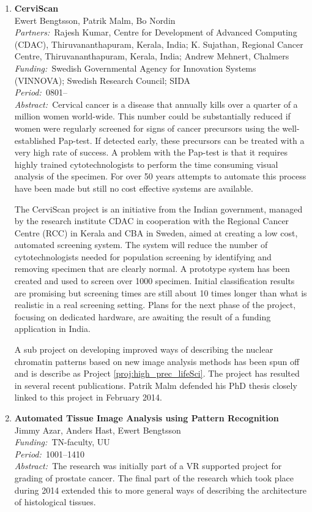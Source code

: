 \documentclass[10pt, a4paper]{article}
\newcommand{\aabstract}[1]{\emph{Abstract:~}#1}
\newcommand{\ffunding}[1]{\emph{Funding:~}#1\\}
\newcommand{\ppartners}[1]{\emph{Partners:~}#1\\}
\newcommand{\pperiod}[1]{\emph{Period:~}#1\\}
\begin{document}
{\begin{enumerate}

\item \textbf{CerviScan}\\
Ewert Bengtsson, Patrik Malm, Bo Nordin\\
\ppartners{Rajesh Kumar, Centre for Development of Advanced Computing (CDAC), Thiruvananthapuram, Kerala, India; K. Sujathan, Regional Cancer Centre, Thiruvananthapuram, Kerala, India; Andrew Mehnert, Chalmers}
\ffunding{Swedish Governmental Agency for Innovation Systems (VINNOVA); Swedish Research Council; SIDA}
\pperiod{0801--}
\aabstract{Cervical cancer is a disease that annually kills over a quarter of a million women world-wide. This number could be substantially reduced if women were regularly screened for signs of cancer precursors using the well-established Pap-test. If detected early, these precursors can be treated with a very high rate of success. A problem with the Pap-test is that it requires highly trained cytotechnologists to perform the time consuming visual analysis of the specimen. For over 50 years attempts to automate this process have been made but still no cost effective systems are available.
	
The CerviScan project is an initiative from the Indian government, managed by the research institute CDAC in cooperation with the Regional Cancer Centre (RCC) in Kerala and CBA in Sweden, aimed at creating a low cost, automated screening system. The system will reduce the number of cytotechnologists needed for population screening by identifying and removing specimen that are clearly normal. A prototype system has been created and used to screen over 1000 specimen. Initial classification results are promising but screening times are still about 10 times longer than what is realistic in a real screening setting. Plans for the next phase of the project, focusing on dedicated hardware, are awaiting the result of a funding application in India.
 
A sub project on developing improved ways of describing the nuclear chromatin patterns based on new image analysis methods has been spun off and is describe as Project \ref{proj:high_prec_lifeSci}. The project has resulted in several recent publications. Patrik Malm defended his PhD thesis closely linked to this project in February 2014.}


\item 
\textbf{Automated Tissue Image Analysis using Pattern Recognition}\\
Jimmy Azar, Anders Hast, Ewert Bengtsson \\
\ffunding{TN-faculty, UU}
\pperiod{1001--1410}
\aabstract{The research was initially part of a VR supported project for grading of prostate cancer. The final part of the research which took place during 2014 extended this to more general ways of describing the architecture of histological tissues.
	 
}
\end{enumerate}}
\end{document}
